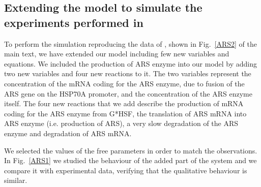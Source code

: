 \documentclass[oneside, 10pt, a4paper, twocolumn]{article}
\begin{document}
\subsection{Extending the model to simulate the experiments performed in \cite{Schroda2000}}
\label{SecARSSM}

To perform the simulation reproducing the data of \cite{Schroda2000}, shown in Fig.~\ref{ARS2} of the main text, we have extended our model including few new variables and equations. 
We included the production of ARS enzyme into our model by adding two new variables and four new reactions to it.
The two variables represent the concentration of the mRNA coding for the ARS enzyme, due to fusion of the ARS gene on the HSP70A promoter, and the concentration of the ARS enzyme itself.
The four new reactions that we add describe the production of mRNA coding for the ARS enzyme from G*HSF, the translation of ARS mRNA into ARS enzyme (i.e. production of ARS), a very slow degradation of the ARS enzyme and degradation of ARS mRNA.


We selected the values of the free parameters in order to match the observations. 
In Fig.~\ref{ARS1} we studied the behaviour of the added part of the system and we compare it with experimental data, verifying that the qualitative behaviour is similar.
\end{document}

